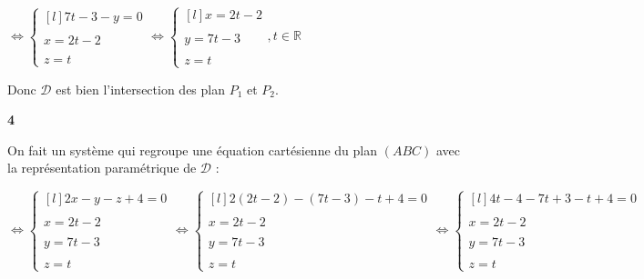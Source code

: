 \documentclass{article}
\begin{document}
\vspace{2mm}

$
\Leftrightarrow
\left\{\begin{matrix*}[l]
   7t-3-y=0\\
   \\
   x=2t-2\\
   \\
   z=t
\end{matrix*}\right.
\Leftrightarrow
\left\{\begin{matrix*}[l]
   x=2t-2\\
   \\
   y=7t-3\\
   \\
   z=t
\end{matrix*}\right., t \in \mathbb{R}
$

\vspace{2mm}

\noindent Donc $\mathscr{D}$ est bien l'intersection des plan $P_1$ et $P_2$.

\vspace{2mm}

\textbf{4}

\vspace{2mm}

On fait un système qui regroupe une équation cartésienne du plan $(ABC)$ avec la représentation paramétrique de $\mathscr{D}$ :

\vspace{2mm}

$
\Leftrightarrow
\left\{\begin{matrix*}[l]
   2x - y - z + 4 = 0\\
   \\
   x=2t-2\\
   \\
   y= 7t-3 \\
   \\
   z = t
\end{matrix*}\right.
\Leftrightarrow
\left\{\begin{matrix*}[l]
   2(2t-2) - (7t-3) - t + 4 = 0 \\
   \\
   x=2t-2\\
   \\
   y=7t-3\\
   \\
   z=t
\end{matrix*}\right.
\Leftrightarrow
\left\{\begin{matrix*}[l]
   4t - 4 - 7t + 3 - t + 4 = 0 \\
   \\
   x=2t-2\\
   \\
   y=7t-3\\
   \\
   z=t
\end{matrix*}\right.
$
\end{document}
